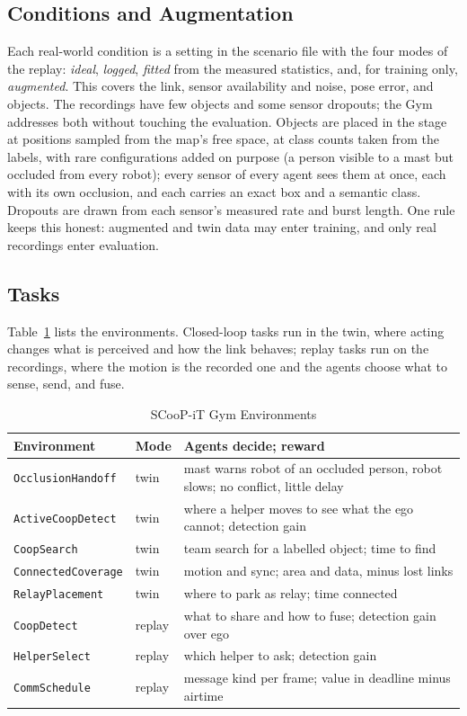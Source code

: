 \subsection{Conditions and Augmentation}
Each real-world condition is a setting in the scenario file with the
four modes of the replay: \emph{ideal}, \emph{logged}, \emph{fitted}
from the measured statistics, and, for training only,
\emph{augmented}. This covers the link, sensor availability and noise,
pose error, and objects. The recordings have few objects and some
sensor dropouts; the Gym addresses both without touching the
evaluation. Objects are placed in the stage at positions sampled from
the map's free space, at class counts taken from the labels, with rare
configurations added on purpose (a person visible to a mast but
occluded from every robot); every sensor of every agent sees them at
once, each with its own occlusion, and each carries an exact box and a
semantic class. Dropouts are drawn from each sensor's measured rate
and burst length. One rule keeps this honest: augmented and twin data
may enter training, and only real recordings enter evaluation.

\subsection{Tasks}
Table~\ref{tab:gym} lists the environments. Closed-loop tasks run in the
twin, where acting changes what is perceived and how the link behaves;
replay tasks run on the recordings, where the motion is the recorded
one and the agents choose what to sense, send, and fuse.

\begin{table}[!t]
\centering
\caption{SCooP-iT Gym Environments}
\label{tab:gym}
\footnotesize
\setlength{\tabcolsep}{3pt}
\begin{tabular}{@{}l l p{3.4cm}@{}}
\toprule
Environment & Mode & Agents decide; reward \\
\midrule
\texttt{OcclusionHandoff} & twin & mast warns robot of an occluded person, robot slows; no conflict, little delay \\
\texttt{ActiveCoopDetect} & twin & where a helper moves to see what the ego cannot; detection gain \\
\texttt{CoopSearch} & twin & team search for a labelled object; time to find \\
\texttt{ConnectedCoverage} & twin & motion and sync; area and data, minus lost links \\
\texttt{RelayPlacement} & twin & where to park as relay; time connected \\
\midrule
\texttt{CoopDetect} & replay & what to share and how to fuse; detection gain over ego \\
\texttt{HelperSelect} & replay & which helper to ask; detection gain \\
\texttt{CommSchedule} & replay & message kind per frame; value in deadline minus airtime \\
\bottomrule
\end{tabular}
\end{table}

